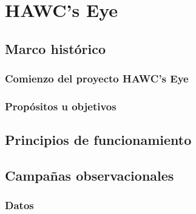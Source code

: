 \chapter{HAWC's Eye}\label{ch:HawcsEye}

\section{Marco histórico}

\subsection{Comienzo del proyecto HAWC's Eye}

\subsection{Propósitos u objetivos}


\section{Principios de funcionamiento}


\section{Campañas observacionales}
\subsection{Datos}
